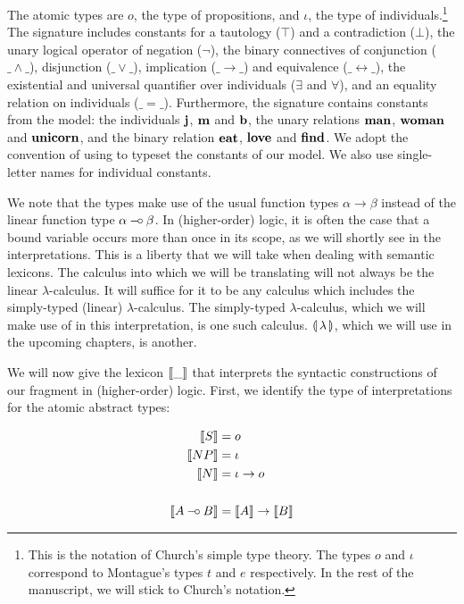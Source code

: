 The atomic types are $o$, the type of propositions, and $\iota$, the type
of individuals.\footnote{This is the notation of Church's simple type
  theory. The types $o$ and $\iota$ correspond to Montague's types $t$ and
  $e$ respectively. In the rest of the manuscript, we will stick to
  Church's notation.} The signature includes constants for a tautology
($\top$) and a contradiction ($\bot$), the unary logical operator of
negation ($\lnot$), the binary connectives of conjunction ($\_ \land \_$),
disjunction ($\_ \lor \_$), implication ($\_ \to \_$) and equivalence
($\_ \leftrightarrow \_$), the existential and universal quantifier over
individuals ($\exists$ and $\forall$), and an equality relation on
individuals ($\_ = \_$). Furthermore, the signature contains constants from
the model: the individuals $\textbf{j}$, $\textbf{m}$ and $\textbf{b}$, the unary
relations $\textbf{man}$, $\textbf{woman}$ and $\textbf{unicorn}$, and the binary
relation $\textbf{eat}$, $\textbf{love}$ and $\textbf{find}$. We adopt the
convention of using  to typeset the constants of our
model. We also use single-letter names for individual constants.

We note that the types make use of the usual function types
$\alpha \to \beta$ instead of the linear function type
$\alpha \mathbin{{-}\mkern-3.5mu{\circ}} \beta$. In (higher-order) logic, it is often the case that a
bound variable occurs more than once in its scope, as we will shortly see
in the interpretations. This is a liberty that we will take when dealing
with semantic lexicons. The calculus into which we will be translating will
not always be the linear $\lambda$-calculus. It will suffice for it to be
any calculus which includes the simply-typed (linear)
$\lambda$-calculus. The simply-typed $\lambda$-calculus, which we will make
use of in this interpretation, is one such calculus. ${\llparenthesis \, \lambda \, \rrparenthesis}$, which we will
use in the upcoming chapters, is another.

We will now give the lexicon $\llbracket \_ \rrbracket$ that interprets the syntactic
constructions of our fragment in (higher-order) logic. First, we identify
the type of interpretations for the atomic abstract types:

\begin{align*}
  \llbracket S \rrbracket &= o \\
  \llbracket NP \rrbracket &= \iota \\
  \llbracket N \rrbracket &= \iota \to o \\
  \\
  \llbracket A \mathbin{{-}\mkern-3.5mu{\circ}} B \rrbracket &= \llbracket A \rrbracket \to \llbracket B \rrbracket
\end{align*}

